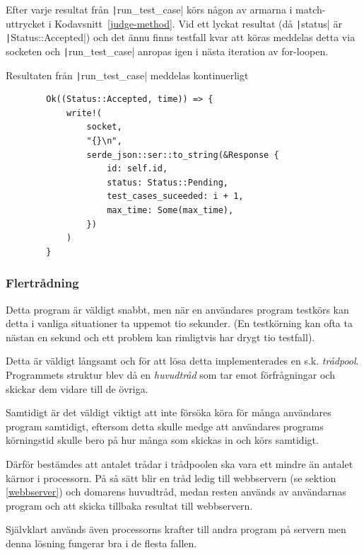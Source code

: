 \documentclass{article}
\renewcommand*\listingscaption{Kodavsnitt}
\newcommand*\coderef[1]{\listingscaption~\ref{#1}}
\begin{document}
Efter varje resultat från \texttt|run_test_case| körs någon av armarna i
match-uttrycket i \coderef{judge-method}. Vid ett lyckat resultat (då
\texttt|status| är \texttt|Status::Accepted|) och det ännu finns testfall kvar
att köras meddelas detta via socketen och
\texttt|run_test_case| anropas igen
i nästa iteration av for-loopen.

\begin{listing}[H]
	\caption{Resultaten från \texttt|run_test_case| meddelas kontinuerligt}
	\begin{verbatim}
		Ok((Status::Accepted, time)) => {
			write!(
				socket,
				"{}\n",
				serde_json::ser::to_string(&Response {
					id: self.id,
					status: Status::Pending,
					test_cases_suceeded: i + 1,
					max_time: Some(max_time),
				})
			)
		}
	\end{verbatim}
\end{listing}

\subsubsection{Flertrådning}

Detta program är väldigt snabbt, men när en användares program testkörs kan
detta i vanliga situationer ta uppemot tio sekunder. (En testkörning kan ofta ta
nästan en sekund och ett problem kan rimligtvis har drygt tio testfall).

Detta är väldigt långsamt och för att lösa detta implementerades en s.k.
\textit{trådpool}. Programmets struktur blev då en \textit{huvudtråd} som tar
emot förfrågningar och skickar dem vidare till de övriga.


Samtidigt är det väldigt viktigt att inte försöka köra för många användares
program samtidigt, eftersom detta skulle medge att användares programs
körningstid skulle bero på hur många som skickas in och körs samtidigt.

Därför bestämdes att antalet trådar i trådpoolen ska vara ett mindre än antalet
kärnor i processorn. På så sätt blir en tråd ledig till webbservern (se
sektion \ref{webbserver}) och domarens huvudtråd, medan resten används av
användarnas program och att skicka tillbaka resultat till webbservern.

Självklart används även processorns krafter till andra program på servern men
denna lösning fungerar bra i de flesta fallen.
\end{document}
